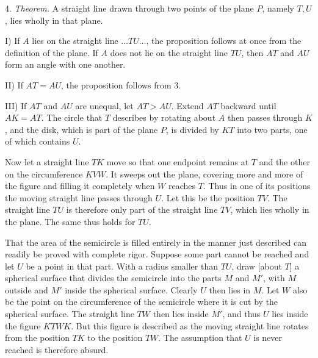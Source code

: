 4. \emph{Theorem.} A straight line drawn through two points of the plane $P$, namely $T, U$,
lies wholly in that plane.

 I) If $A$ lies on the straight line $\ldots TU \ldots$, the proposition follows at once from
the definition of the plane. If $A$ does not lie on the straight line $TU$, then
$AT$ and $AU$ form an angle with one another.

II) If $AT = AU$, the proposition follows from 3.

III) If $AT$ and $AU$ are unequal, let $AT > AU$. Extend $AT$ backward
until $AK = AT$. The circle that $T$ describes by rotating about $A$
then passes through $K$, and the disk, which is part of the plane $P$,
is divided by $KT$ into two parts, one of which contains $U$.

\begin{center}

\end{center}

Now let a straight line $TK$ move so that one endpoint remains at $T$ and
the other on the circumference $KVW$. It sweeps out the plane,
covering more and more of the figure and filling it completely when $W$ reaches $T$.
Thus in one of its positions the moving straight line passes through $U$.
Let this be the position $TV$. The straight line $TU$ is therefore only part
of the straight line $TV$, which lies wholly in the plane. The same thus holds
for $TU$.



That the area of the semicircle is filled entirely in the manner just described
can readily be proved with complete rigor.
Suppose some part cannot be reached and let $U$ be a point in
that part. With a radius smaller than $TU$, draw [about $T$] a
spherical surface that divides the semicircle into the parts $M$ and $M'$,
with $M$ outside and $M'$ inside the spherical surface. Clearly
$U$ then lies in $M$. Let $W$ also be the point on the circumference of the semicircle
where it is cut by the spherical surface. The straight line $TW$ then lies
inside $M'$, and thus $U$ lies inside the figure $KTWK$. But this figure is described
as the moving straight line rotates from the position $TK$ to the
position $TW$. The assumption that $U$ is never reached is therefore
absurd.

